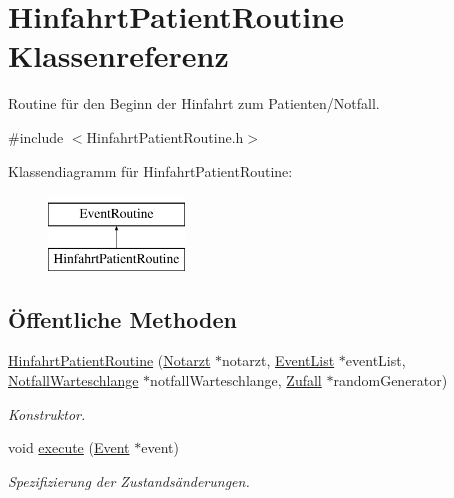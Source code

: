 \hypertarget{classHinfahrtPatientRoutine}{}\section{Hinfahrt\+Patient\+Routine Klassenreferenz}
\label{classHinfahrtPatientRoutine}


Routine für den Beginn der Hinfahrt zum Patienten/\+Notfall.  




{\ttfamily \#include $<$Hinfahrt\+Patient\+Routine.\+h$>$}

Klassendiagramm für Hinfahrt\+Patient\+Routine\+:\begin{figure}[H]
\begin{center}
\leavevmode
\includegraphics[height=2.000000cm]{classHinfahrtPatientRoutine}
\end{center}
\end{figure}
\subsection*{Öffentliche Methoden}
\begin{DoxyCompactItemize}
\item 
\hyperlink{classHinfahrtPatientRoutine_aef87b22e6bb463ec319534f2e33ba8be}{Hinfahrt\+Patient\+Routine} (\hyperlink{classNotarzt}{Notarzt} $\ast$notarzt, \hyperlink{classEventList}{Event\+List} $\ast$event\+List, \hyperlink{classNotfallWarteschlange}{Notfall\+Warteschlange} $\ast$notfall\+Warteschlange, \hyperlink{classZufall}{Zufall} $\ast$random\+Generator)
\begin{DoxyCompactList}\small\item\em Konstruktor. \end{DoxyCompactList}\item 
void \hyperlink{classHinfahrtPatientRoutine_a95ee9981032536e15cad4bbe0fcb6903}{execute} (\hyperlink{classEvent}{Event} $\ast$event)
\begin{DoxyCompactList}\small\item\em Spezifizierung der Zustandsänderungen. \end{DoxyCompactList}\end{DoxyCompactItemize}


